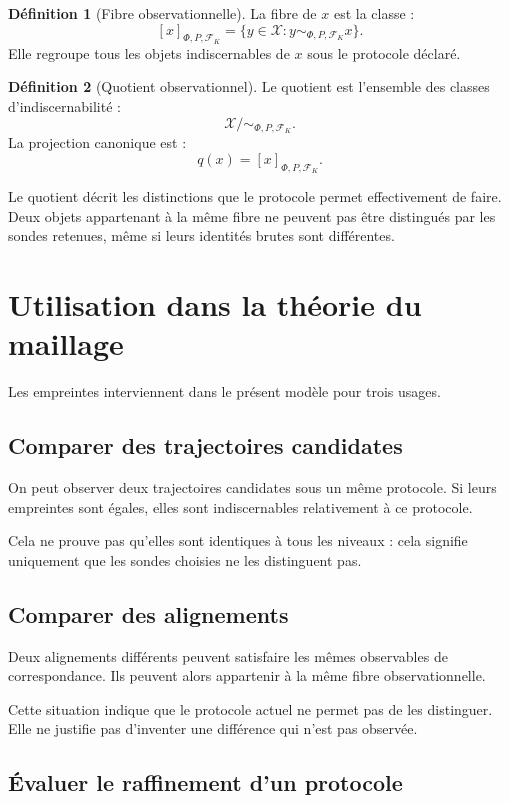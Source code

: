 \documentclass[11pt,a4paper]{report}
\theoremstyle{definition}
\newtheorem{definition}{Définition}[chapter]
\theoremstyle{plain}
\theoremstyle{remark}
\newcommand{\X}{\mathcal{X}}
\newcommand{\F}{\mathcal{F}}
\begin{document}
\begin{definition}[Fibre observationnelle]
La fibre de \(x\) est la classe :
\[
[x]_{\Phi,P,\F_K}
=
\{y\in\X:y\sim_{\Phi,P,\F_K}x\}.
\]
Elle regroupe tous les objets indiscernables de \(x\) sous le
protocole déclaré.
\end{definition}

\begin{definition}[Quotient observationnel]
Le quotient est l'ensemble des classes d'indiscernabilité :
\[
\X/{\sim_{\Phi,P,\F_K}}.
\]
La projection canonique est :
\[
q(x)=[x]_{\Phi,P,\F_K}.
\]
\end{definition}

Le quotient décrit les distinctions que le protocole permet
effectivement de faire. Deux objets appartenant à la même fibre
ne peuvent pas être distingués par les sondes retenues, même
si leurs identités brutes sont différentes.

\section{Utilisation dans la théorie du maillage}

Les empreintes interviennent dans le présent modèle pour trois
usages.

\subsection{Comparer des trajectoires candidates}

On peut observer deux trajectoires candidates sous un même
protocole. Si leurs empreintes sont égales, elles sont
indiscernables relativement à ce protocole.

Cela ne prouve pas qu'elles sont identiques à tous les niveaux :
cela signifie uniquement que les sondes choisies ne les
distinguent pas.

\subsection{Comparer des alignements}

Deux alignements différents peuvent satisfaire les mêmes
observables de correspondance. Ils peuvent alors appartenir à
la même fibre observationnelle.

Cette situation indique que le protocole actuel ne permet pas
de les distinguer. Elle ne justifie pas d'inventer une différence
qui n'est pas observée.

\subsection{Évaluer le raffinement d'un protocole}
\end{document}

